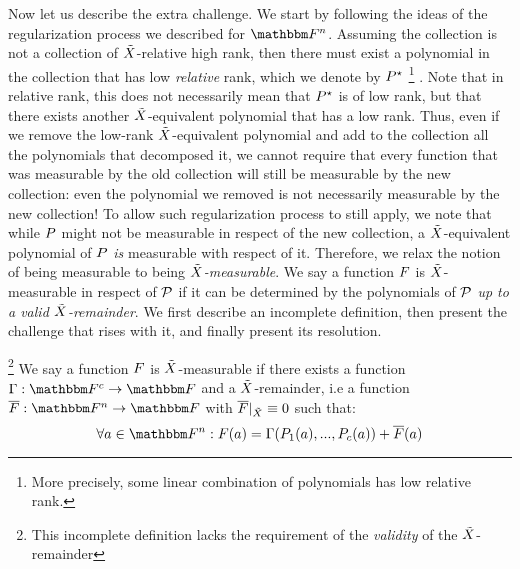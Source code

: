 Now let us describe the extra challenge.
We start by following the ideas of the regularization process we described for $\field$.
Assuming the collection is not a collection of ${\tilde{X}}$-relative high rank, then there must exist a polynomial in the collection that has low \emph{relative} rank, which we denote by $\genpoly^\star$
\footnote{More precisely, some linear combination of polynomials has low relative rank.}
.
Note that in relative rank, this does not necessarily mean that $\genpoly^\star$ is of low rank, but that there exists another ${\tilde{X}}$-equivalent polynomial that has a low rank.
Thus, even if we remove the low-rank ${\tilde{X}}$-equivalent polynomial and add to the collection all the polynomials that decomposed it,
we cannot require that every function that was measurable by the old collection will still be measurable by the new collection:
even the polynomial we removed is not necessarily measurable by the new collection!
\newline
To allow such regularization process to still apply, we note that while $\genpoly$ might not be measurable in respect of the new collection, a ${\tilde{X}}$-equivalent polynomial of $\genpoly$ \emph{is} measurable with respect of it.
Therefore, we relax the notion of being measurable to being \emph{${\tilde{X}}$-measurable}.
\newline
We say a function $\genfunc$ is ${\tilde{X}}$-measurable in respect of $\genpolyset$ if it can be determined by the polynomials of $\genpolyset$
\emph{up to a valid ${\tilde{X}}$-remainder}.
We first describe an incomplete definition, then present the challenge that rises with it, and finally present its resolution.
\begin{definition}
\footnote{This incomplete definition lacks the requirement of the \emph{validity} of the ${\tilde{X}}$-remainder}
We say a function $\genfunc$ is ${\tilde{X}}$-measurable
if there exists a function $\funcdef{\Gamma}{\basefield^c}{\basefield}$
and a ${\tilde{X}}$-remainder, i.e a function $\funcdef{\relativeremainder{\genfunc}}{\field}{\basefield}$ with $\restrictfunc{\relativeremainder{\genfunc}}{\variety} \equiv 0$
such that:
\[
    \forall a \in \field: \genfunc(a) = \Gamma(\genpoly_1(a),...,\genpoly_c(a)) + \relativeremainder{\genfunc}(a)
\]
\end{definition}

